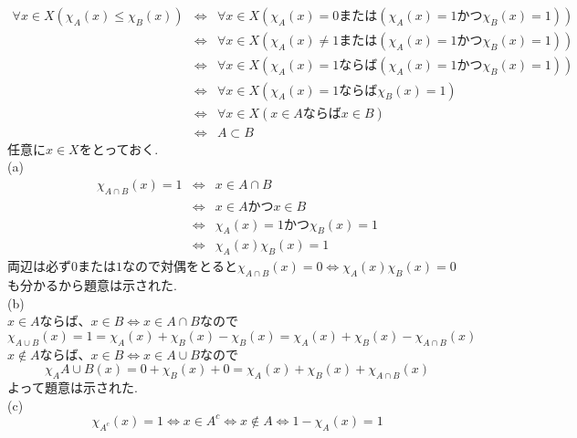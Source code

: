\documentclass{jsarticle}
\begin{document}
\subsection{} %
\begin{eqnarray*}
	\forall{x \in X}(\chi_A(x) \leq \chi_B(x))
	&\Leftrightarrow& \forall{x \in X}(\chi_A(x) = 0 または (\chi_A(x) = 1 かつ \chi_B(x) = 1))\\
	&\Leftrightarrow& \forall{x \in X}(\chi_A(x) \neq 1 または (\chi_A(x) = 1 かつ \chi_B(x) = 1))\\
	&\Leftrightarrow& \forall{x \in X}(\chi_A(x) = 1 ならば (\chi_A(x) = 1 かつ \chi_B(x) = 1))\\
	&\Leftrightarrow& \forall{x \in X}(\chi_A(x) = 1 ならば \chi_B(x) = 1)\\
	&\Leftrightarrow& \forall{x \in X}(x \in A ならば x \in B)\\
	&\Leftrightarrow&  A \subset B
\end{eqnarray*}
任意に$x \in X$をとっておく.\\
(a)
\begin{eqnarray*}
	\chi_{A \cap B}(x) = 1
	&\Leftrightarrow& x \in A \cap B\\
	&\Leftrightarrow& x \in A かつ x \in B\\
	&\Leftrightarrow& \chi_A(x) = 1 かつ \chi_B(x) = 1\\
	&\Leftrightarrow& \chi_A(x)\chi_B(x) = 1
\end{eqnarray*}
両辺は必ず$0$または$1$なので対偶をとると$\chi_{A \cap B}(x) = 0 \Leftrightarrow \chi_A(x)\chi_B(x) = 0$も分かるから題意は示された.\\
(b)\\
$x \in A$ならば、$x \in B \Leftrightarrow x \in A \cap B$なので
\begin{equation*}
	\chi_{A \cup B}(x) = 1 = \chi_A(x) + \chi_B(x) - \chi_B(x) = \chi_A(x) + \chi_B(x) - \chi_{A \cap B}(x)
\end{equation*}
$x \notin A$ならば、$x \in B \Leftrightarrow x \in A \cup B$なので
\begin{equation*}
	\chi_A{A \cup B}(x) = 0 + \chi_B(x) + 0 = \chi_A(x) + \chi_B(x) + \chi_{A \cap B}(x)
\end{equation*}
よって題意は示された.\\
(c)\\
\begin{equation*}
	\chi_{A^c}(x) = 1 \Leftrightarrow x \in A^c \Leftrightarrow x \notin A \Leftrightarrow 1 - \chi_A(x) = 1
\end{equation*}
\end{document}
